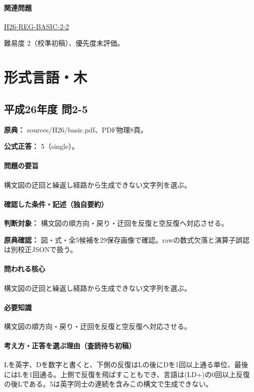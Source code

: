\paragraph{関連問題} \hyperref[q:h26-reg-basic-2-2]{H26-REG-BASIC-2-2}

\par 難易度 2（校準初稿）、優先度未評価。

\section{形式言語・木}

\subsection{平成26年度 問2-5}
\label{q:h26-reg-basic-2-5}

\noindent\textbf{原典：} sources/H26/basic.pdf、PDF物理8頁。

\textbf{公式正答：} 5（single）。

\paragraph{問題の要旨} 構文図の迂回と繰返し経路から生成できない文字列を選ぶ。

\paragraph{確認した条件・記述（独自要約）}\mbox{}\par

\noindent\textbf{判断対象：} 構文図の順方向・戻り・迂回を反復と空反復へ対応させる。\par

\noindent\textbf{原典確認：} 図・式・全5候補を29保存画像で確認。rawの数式欠落と演算子誤認は別校正JSONで扱う。\par

\paragraph{問われる核心} 構文図の迂回と繰返し経路から生成できない文字列を選ぶ。

\paragraph{必要知識} 構文図の順方向・戻り・迂回を反復と空反復へ対応させる。

\paragraph{考え方・正答を選ぶ理由（査読待ち初稿）} Lを英字、Dを数字と書くと、下側の反復はLの後にDを1回以上通る単位、最後にはLを1回通る。上側で反復を飛ばすこともでき、言語は(LD+)の0回以上反復の後Lである。5は英字同士の連続を含みこの構文で生成できない。


